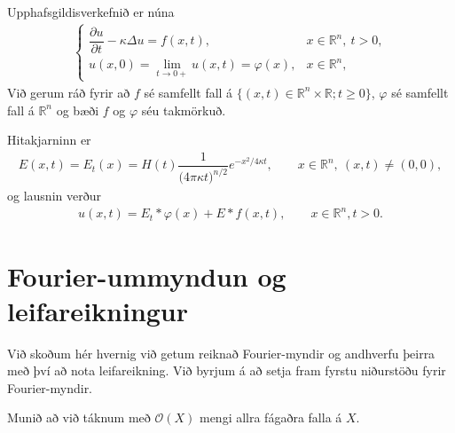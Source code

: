 \documentclass[a4paper,10pt,icelandic]{sphinxmanual}
\begin{document}
Upphafsgildisverkefnið er núna
\begin{equation*}
\begin{split}\begin{cases}
\dfrac{{\partial}u}{\partial t}
-{\kappa}\Delta u=f(x,t), &x\in {{\mathbb  R}}^n, \ t>0,\\
u(x,0)=\lim\limits_{t\to 0+}u(x,t)={\varphi}(x), &x\in {{\mathbb  R}}^n,
\end{cases}\end{split}
\end{equation*}
Við gerum ráð fyrir að \(f\) sé samfellt fall á \(\{(x,t)\in {{\mathbb R}}^n\times {{\mathbb R}}; t\geq 0\}\), \({\varphi}\) sé samfellt fall á \({{\mathbb R}}^n\) og bæði \(f\) og \({\varphi}\) séu takmörkuð.

Hitakjarninn er
\begin{equation*}
\begin{split}E(x,t)=E_t(x)=H(t) \dfrac
1{\big(4{\pi}{\kappa}t\big)^{n/2}}e^{-x^2/4{\kappa}t},
\qquad x\in {{\mathbb  R}}^n,\ (x,t)\neq (0,0),\end{split}
\end{equation*}
og lausnin verður
\begin{equation*}
\begin{split}u(x,t)=E_t\ast {\varphi}(x)+E\ast f(x,t), \qquad x\in {{\mathbb  R}}^n, t>0.\end{split}
\end{equation*}

\section{Fourier-ummyndun og leifareikningur}
\label{\detokenize{Kafli04:fourier-ummyndun-og-leifareikningur}}
Við skoðum hér hvernig við getum reiknað Fourier-myndir og andhverfu þeirra með því að nota leifareikning.
Við byrjum á að setja fram fyrstu niðurstöðu fyrir Fourier-myndir.

Munið að við táknum með \(\mathcal O(X)\) mengi allra fágaðra falla á \(X\).
\end{document}

